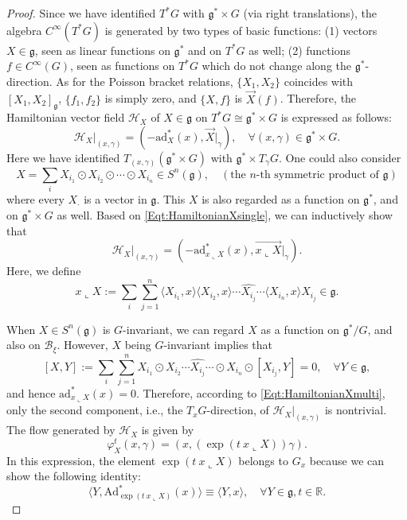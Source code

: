 \documentclass[10pt,a4paper]{amsart}
\newcommand{\Adjointaction}{\mathrm{Ad}}
\newcommand{\Bxi}{\mathcal{B}_{\xi}}
\newcommand{\Hamiltonian}[1]{\mathcal{H}_{#1}}
\newcommand{\SET}[1]{\{#1\}}
\newcommand{\galgebra}{\mathfrak{g}}
\newcommand{\gstar}{\mathfrak{g}^*}
\begin{document}
\begin{proof}
  Since we have identified $T^*G$ with $ \gstar\times G$ (via right translations), the algebra   $C^\infty(T^*G)$ is generated by two types of basic functions:  (1) vectors $X\in \galgebra$, seen as linear functions on $\gstar$ and on $T^*G$ as well; (2) functions $f\in C^\infty(G)$, seen as functions on $T^*G$ which do not change along the $\gstar$-direction. As for the Poisson bracket relations, $\SET{X_1,X_2}$ coincides with $[X_1,X_2]_{\galgebra}$, $\SET{f_1,f_2}$ is simply zero, and $\SET{X,f}$ is $\overrightarrow{X}(f)$. Therefore, the Hamiltonian vector field $\Hamiltonian{X}$ of $X\in \galgebra$ on $T^*G\cong \gstar \times G$ is expressed as follows: \begin{equation}\label{Eqt:HamiltonianXsingle}
\Hamiltonian{X}|_{(x,\gamma)}=(-\mathrm{ad}_X^*(x),\overrightarrow{X}|_{\gamma}),\quad \forall (x,\gamma)\in \gstar\times G.            
         \end{equation}
Here we have identified $ T_{(x,\gamma)}(\gstar\times G)$ with $\gstar\times T_{\gamma}G$.
 One could also consider 
 $$X=\sum_i X_{i_1}\odot X_{i_2} \odot \cdots \odot X_{i_n}\in S^n(\galgebra), \quad(\mbox{the $n$-th symmetric product of }\galgebra)  $$
where every $X_{\cdot}$ is a vector in $\galgebra$. This $X$ is also regarded as a function on $\gstar$, and on $\gstar\times G$ as well. Based on \eqref{Eqt:HamiltonianXsingle}, we can inductively show that
\begin{equation}\label{Eqt:HamiltonianXmulti}
\Hamiltonian{X}|_{(x,\gamma)}=
(-\mathrm{ad}_{x \llcorner X}^*(x),\overrightarrow{x\llcorner X}|_{\gamma}).            
         \end{equation}
         Here, we define 
         $$x\llcorner X:=\sum_i \sum_{j=1}^n \langle X_{i_1},x \rangle \langle X_{i_2},x \rangle   \cdots \widehat{X_{i_j}} \cdots \langle X_{i_n}, x \rangle X_{i_j} \in \galgebra. $$

When $X\in S^n(\galgebra)$ is $G$-invariant, we can regard $X$ as a function on $\gstar/G$, and also on $\Bxi$.  However, $X$ being $G$-invariant implies that 
\begin{equation}\label{Eqt:tempXGinvairantzero}
 [X,Y]:=\sum_i \sum_{j=1}^n  X_{i_1}  \odot X_{i_2}    \cdots \widehat{X_{i_j}} \cdots \odot X_{i_n} \odot [X_{i_j},Y]=0,\quad \forall Y \in \galgebra,
\end{equation}
and hence 
$\mathrm{ad}_{x \llcorner X}^*(x)=0$. Therefore, according to \eqref{Eqt:HamiltonianXmulti}, only the second component,  i.e., the $T_xG$-direction, of $\Hamiltonian{X}|_{(x,\gamma)}$  is nontrivial. The flow generated by $\Hamiltonian{X}$ is given by
\begin{equation}\label{Eqt:flowX} \varphi^t_X(x,\gamma)=(x,(\exp(t ~x\llcorner X))\gamma).
\end{equation}
 In this expression, the element $\exp(t ~x\llcorner X)$ belongs to $G_x$ because we can show the following identity:
 \begin{equation}\label{Eqt:temphere}
  \langle Y, \Adjointaction^*_{\exp(t ~x\llcorner X)}(x) \rangle \equiv \langle Y, x \rangle,\quad \forall Y\in \galgebra, t\in \mathbb{R}.
 \end{equation}
 

\end{proof}
\end{document}
